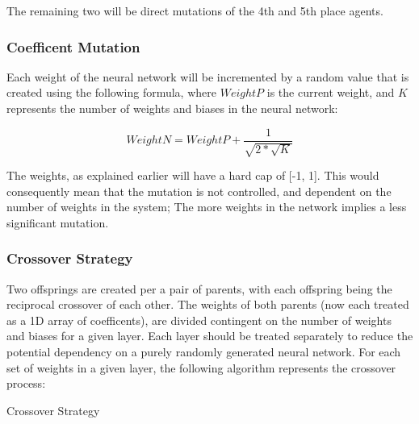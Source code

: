 \documentclass[12pt,a4paper]{article}
\makeatletter
\def\BState{\State\hskip-\ALG@thistlm}
\makeatother
\begin{document}
The remaining two will be direct mutations of the 4th and 5th place agents.

\subsubsection{Coefficent Mutation}

Each weight of the neural network will be incremented by a random value that is created using the following formula, where $WeightP$ is the current weight, and $K$ represents the number of weights and biases in the neural network:

$$ WeightN = WeightP + \frac{1}{\sqrt{2 * \sqrt{K} }}$$

The weights, as explained earlier will have a hard cap of [-1, 1]. This would consequently mean that the mutation is not controlled, and dependent on the number of weights in the system; The more weights in the network implies a less significant mutation.

\subsubsection{Crossover Strategy}

Two offsprings are created per a pair of parents, with each offspring being the reciprocal crossover of each other. The weights of both parents (now each treated as a 1D array of coefficents), are divided contingent on the number of weights and biases for a given layer. Each layer should be treated separately to reduce the potential dependency on a purely randomly generated neural network. For each set of weights in a given layer, the following algorithm represents the crossover process:

\begin{algorithm}
    \caption{Crossover Strategy}\label{euclid}
\end{algorithm}
\end{document}
